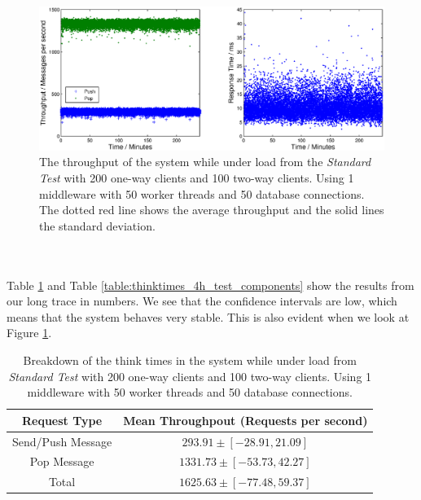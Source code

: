\documentclass{article}
\begin{document}
            \begin{figure}[H]
                \centering
                \centerline{\includegraphics[scale=0.5]{4h_throughput_respTime}}
                \caption{The throughput of the system while under load from the \textit{Standard Test} with 200 one-way clients and 100 two-way clients. Using 1 middleware with 50 worker threads and 50 database connections. The dotted red line shows the average throughput and the solid lines the standard deviation.}
                \label{fig:4h_throughput_respTime}
            \end{figure}
            ~\\
            ~\\
            Table \ref{table:throughput_4h_test} and Table \ref{table:thinktimes_4h_test_components} show the results from our long trace in numbers. We see that the confidence intervals are low, which means that the system behaves very stable. This is also evident when we look at Figure \ref{fig:4h_throughput_respTime}.\\

            \begin{table}[H]
                \centering
                \begin{tabular}{|c|c|}
                   \hline 
                    \textbf{Request Type} & \textbf{Mean Throughpout} (Requests per second) \\ 
                        \hline 
                        Send/Push Message& $293.91 \pm [-28.91 , 21.09]$\\ 
                        \hline 
                        Pop Message & $1331.73 \pm [-53.73 , 42.27]$ \\ 
                        \hline 
                        Total & $1625.63 \pm [-77.48 , 59.37]$\\ 
                        \hline 
                    \end{tabular}
                    \caption{Breakdown of the think times in the system while under load from \textit{Standard Test} with 200 one-way clients and 100 two-way clients. Using 1 middleware with 50 worker threads and 50 database connections.}
                    \label{table:throughput_4h_test}
                \end{table} 
\end{document}
